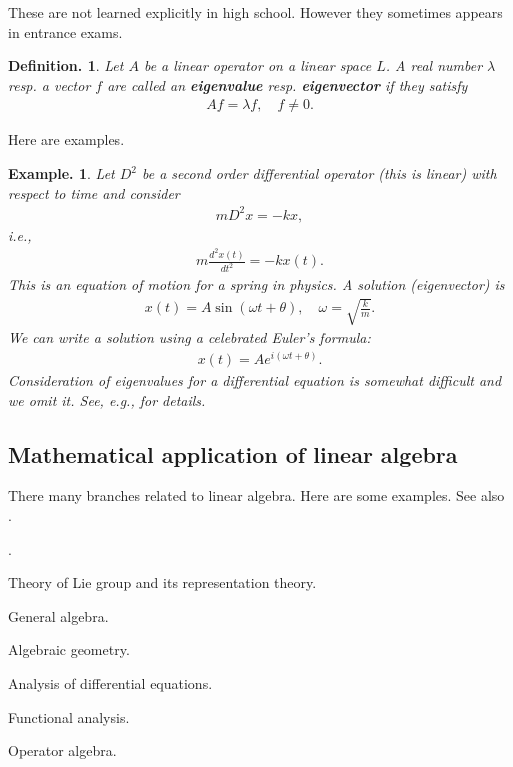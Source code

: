 \documentclass[openany, a4paper, oneside]{book}
\newcounter{enum2}
\renewenvironment{enumerate}{%
\begin{list}%
{%
\arabic{enum2}.\ \,%
}%
{%
\usecounter{enum2}
\setlength{\itemindent}{0pt}%
\setlength{\leftmargin}{6pt}%
\setlength{\rightmargin}{0pt}%
\setlength{\labelsep}{0pt}%
\setlength{\labelwidth}{6pt}%
\setlength{\itemsep}{0pt}%
\setlength{\parsep}{0pt}%
\setlength{\listparindent}{0pt}%
}
}{%
\end{list}%
}
\theoremstyle{break}
\theoremstyle{breakdefn}
\newtheorem{defn}[thm]{Definition.}
\newtheorem{ex}[thm]{Example.}
\newcommand{\rbk}[1]{\left (#1\right)}
\newcommand{\upbf}[1]{\textup{\textbf{#1}}}
\begin{document}
These are not learned explicitly in high school.
However they sometimes appears in entrance exams.
\begin{defn}
 Let $A$ be a linear operator on a linear space $L$.
 A real number $\lambda$ resp. a vector $f$ are called an \upbf{eigenvalue} resp. \upbf{eigenvector}
 if they satisfy
 \begin{align}
  A f = \lambda f, \quad
  f \neq 0.
 \end{align}
\end{defn}
Here are examples.
\begin{ex}
 Let $D^2$ be a second order differential operator (this is linear) with respect to time and consider
  \begin{align}
   m D^2 x
   =
   -k x,
  \end{align}
 i.e.,
  \begin{align}
   m \frac{d^2 x (t)}{dt^2}
   =
   -k x(t).
  \end{align}
 This is an equation of motion for a spring in physics.
 A solution (eigenvector) is
  \begin{align}
   x(t)
   =
   A \sin \rbk{\omega t + \theta}, \quad
   \omega
   =
   \sqrt{\frac{k}{m}}.
  \end{align}
 We can write a solution using a celebrated Euler's formula:
  \begin{align}
   x(t)
   =
   A e^{i \rbk{\omega t + \theta}}.
  \end{align}
 Consideration of eigenvalues for a differential equation is somewhat difficult and we omit it.
 See, e.g., \cite{HaimBrezis1, HaimBrezis2} for details.
\end{ex}
\subsection{Mathematical application of linear algebra}
\label{sec-4-1-2-8}

There many branches related to linear algebra.
Here are some examples.
See also \cite{phasetr2}.
\begin{enumerate}
\item Theory of Lie group and its representation theory.
\item General algebra.
\item Algebraic geometry.
\item Analysis of differential equations.
\item Functional analysis.
\item Operator algebra.
\end{enumerate}
\end{document}
